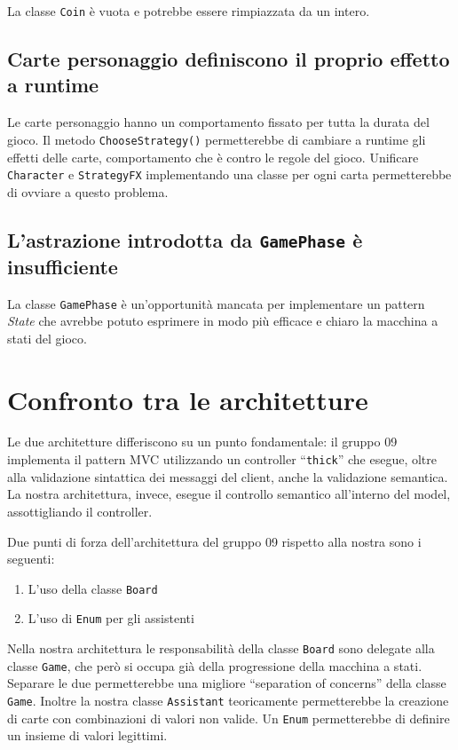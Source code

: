 \documentclass[12pt]{article}
\begin{document}
    La classe \texttt{Coin} è vuota e potrebbe essere rimpiazzata da un intero.

    \subsection{Carte personaggio definiscono il proprio effetto a runtime}

    Le carte personaggio hanno un comportamento fissato per tutta la durata del
    gioco. Il metodo \texttt{ChooseStrategy()} permetterebbe di cambiare a
    runtime gli effetti delle carte, comportamento che è contro le regole del
    gioco. Unificare \texttt{Character} e \texttt{StrategyFX}
    implementando una classe per ogni carta permetterebbe di ovviare a questo
    problema.

    \subsection{L'astrazione introdotta da \texttt{GamePhase} è insufficiente}

    La classe \texttt{GamePhase} è un'opportunità mancata per implementare un
    pattern \textit{State} che avrebbe potuto esprimere in modo più efficace
    e chiaro la macchina a stati del gioco.


    \section{Confronto tra le architetture}

    Le due architetture differiscono su un punto fondamentale: il gruppo 09
    implementa il pattern MVC utilizzando un controller ``\texttt{thick}'' che
    esegue, oltre alla validazione sintattica dei messaggi del client, anche la
    validazione semantica. La nostra architettura, invece, esegue il controllo
    semantico all'interno del model, assottigliando il controller.

    Due punti di forza dell'architettura del gruppo 09 rispetto alla nostra sono
    i seguenti:

    \begin{enumerate}
        \item L'uso della classe \texttt{Board}
        \item L'uso di \texttt{Enum} per gli assistenti
    \end{enumerate}

    Nella nostra architettura le responsabilità della classe \texttt{Board} sono
    delegate alla classe \texttt{Game}, che però si occupa già della
    progressione della macchina a stati. Separare le due permetterebbe una
    migliore ``separation of concerns'' della classe \texttt{Game}. Inoltre la
    nostra classe \texttt{Assistant} teoricamente permetterebbe la creazione di
    carte con combinazioni di valori non valide. Un \texttt{Enum} permetterebbe
    di definire un insieme di valori legittimi.
\end{document}
